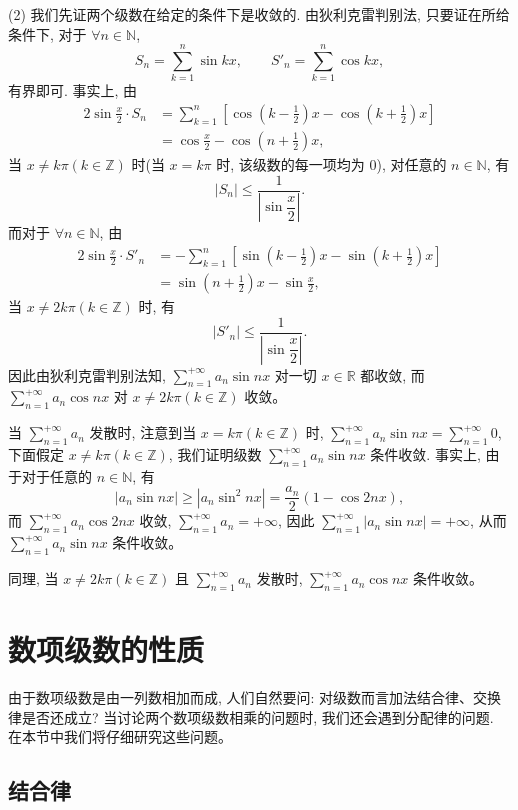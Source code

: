 \documentclass[UTF8, 12pt, fontset=fandol, oneside]{ctexart}
\begin{document}
(2) 我们先证两个级数在给定的条件下是收敛的. 由狄利克雷判别法, 只要证在所给条件下, 对于 $\forall n\in\mathbb{N}$,
\[
  S_n=\sum_{k=1}^n\sin kx,\qquad S'_n=\sum_{k=1}^n\cos kx,
\]
有界即可. 事实上, 由
\[
\begin{aligned}
  2\sin\frac{x}{2}\cdot S_n
  &=\sum_{k=1}^n\left[\cos\left(k-\frac12\right)x-\cos\left(k+\frac12\right)x\right]\\
  &=\cos\frac{x}{2}-\cos\left(n+\frac12\right)x,
\end{aligned}
\]
当 $x\neq k\pi(k\in\mathbb{Z})$ 时(当 $x=k\pi$ 时, 该级数的每一项均为 0), 对任意的 $n\in\mathbb{N}$, 有
\[
  |S_n|\leq\frac1{\left|\sin\dfrac{x}{2}\right|}.
\]
而对于 $\forall n\in\mathbb{N}$, 由
\[
\begin{aligned}
  2\sin\frac{x}{2}\cdot S'_n
  &=-\sum_{k=1}^n\left[\sin\left(k-\frac12\right)x-\sin\left(k+\frac12\right)x\right]\\
  &=\sin\left(n+\frac12\right)x-\sin\frac{x}{2},
\end{aligned}
\]
当 $x\neq2k\pi(k\in\mathbb{Z})$ 时, 有
\[
  |S'_n|\leq\frac1{\left|\sin\dfrac{x}{2}\right|}.
\]
因此由狄利克雷判别法知, $\sum\limits_{n=1}^{+\infty}a_n\sin nx$ 对一切 $x\in\mathbb{R}$ 都收敛, 而 $\sum\limits_{n=1}^{+\infty}a_n\cos nx$ 对 $x\neq2k\pi(k\in\mathbb{Z})$ 收敛。

当 $\sum\limits_{n=1}^{+\infty}a_n$ 发散时, 注意到当 $x=k\pi(k\in\mathbb{Z})$ 时, $\sum\limits_{n=1}^{+\infty}a_n\sin nx=\sum\limits_{n=1}^{+\infty}0$, 下面假定 $x\neq k\pi(k\in\mathbb{Z})$, 我们证明级数 $\sum\limits_{n=1}^{+\infty}a_n\sin nx$ 条件收敛. 事实上, 由于对于任意的 $n\in\mathbb{N}$, 有
\[
  |a_n\sin nx|\geq |a_n\sin^2 nx|=\frac{a_n}{2}(1-\cos2nx),
\]
而 $\sum\limits_{n=1}^{+\infty}a_n\cos2nx$ 收敛, $\sum\limits_{n=1}^{+\infty}a_n=+\infty$, 因此 $\sum\limits_{n=1}^{+\infty}|a_n\sin nx|=+\infty$, 从而 $\sum\limits_{n=1}^{+\infty}a_n\sin nx$ 条件收敛。

同理, 当 $x\neq2k\pi(k\in\mathbb{Z})$ 且 $\sum\limits_{n=1}^{+\infty}a_n$ 发散时, $\sum\limits_{n=1}^{+\infty}a_n\cos nx$ 条件收敛。

\section{数项级数的性质}

由于数项级数是由一列数相加而成, 人们自然要问: 对级数而言加法结合律、交换律是否还成立? 当讨论两个数项级数相乘的问题时, 我们还会遇到分配律的问题. 在本节中我们将仔细研究这些问题。

\subsection{结合律}
\end{document}

